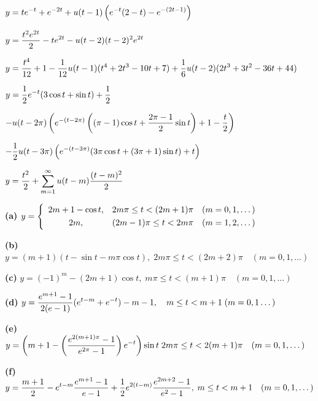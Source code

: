 $y=\displaystyle{te^{-t}+e^{-2t}+u(t-1)\left(e^{-t}(2-t)-e^{-(2t-1)}\right)}$

$y=\displaystyle\frac{t^{2}e^{2t}}{2}-te^{2t}-u(t-2)(t-2)^{2}e^{2t}$

$y=\displaystyle{\frac{t^{4}}{12}+1-\frac{1}{12}u(t-1)(t^{4}+2t^{3}-10t+7)+
\frac{1}{6}u(t-2)(2t^{3}+3t^{2}-36t+44)}$

$y=\displaystyle{\frac{1}{2}e^{-t}(3\cos t+\sin t)+\frac{1}{2}}$

\quad\;
$\displaystyle{-u(t-2\pi)\left(
e^{-(t-2\pi)}\left((\pi-1)\cos t+\frac{2\pi-1}{2}\sin t\right)+
1-\frac{t}{2}\right)}$

\quad\;
$\displaystyle{-\frac{1}{2}u(t-3\pi)\left(e^{-(t-3\pi)}(3\pi\cos
t+(3\pi+1)\sin t
)+t\right)}$

$y=\displaystyle{\frac{t^{2}}{2}+\sum_{m=1}^{\infty}u(t-m)\frac{(t-m)^{2}}{2}}$

{\bf (a)} $y=\displaystyle{\left\{\begin{array}{cll}2m+1-\cos t,&2m\pi\le
t<(2m+1)\pi&(m=0,1,\dots)\\[1\jot]2m,&(2m-1)\pi\le
t<2m\pi&(m=1,2,\dots)\end{array}\right.}$

\quad\;
{\bf (b)}
$y=(m+1)(t-\sin t-m\pi\cos t),\;2m\pi\le t<(2m+2)\pi\quad
(m=0,1,\dots)$

\quad\;
{\bf (c)}
$y=(-1)^{m}-(2m+1)\cos t,\;m\pi\le t<(m+1)\pi\quad(m=0,1,\dots)$

\quad\;
{\bf (d)}
$y=\displaystyle{\frac{e^{m+1}-1}{2(e-1)}(e^{t-m}+e^{-t})-m-1,\quad m\le t<m+1
\;(m=0,1\dots)}$

\quad\;
{\bf (e)}
$y=\displaystyle{\left(m+1-\left(\frac{e^{2(m+1)\pi}-1}{e^{2\pi}-1}\right)e^{-t}\right)\sin
t\;2m\pi\le t<2(m+1)\pi\quad(m=0,1,\dots)}$

\quad\;
{\bf (f)}
$y=\displaystyle{\frac{m+1}{2}-e^{t-m}\frac{e^{m+1}-1}{e-1}+\frac{1}{2}e^{2(t-m)}\frac{e^{2m+2}-1}{e^{2}-1},
\;m\le t<m+1\quad(m=0,1,\dots)}$

